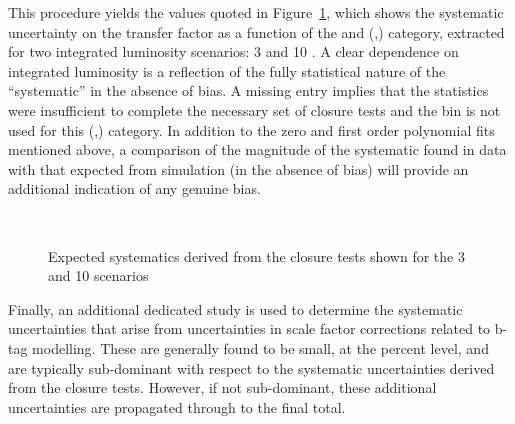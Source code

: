 This procedure yields the values quoted in
Figure~\ref{fig:systematics}, which shows the systematic uncertainty
on the transfer factor as a function of the \scalht and (\nb,\njet)
category, extracted for two integrated luminosity scenarios: 3 \ifb
and 10 \ifb. A clear dependence on integrated luminosity is a
reflection of the fully statistical nature of the ``systematic'' in
the absence of bias. A missing entry implies that the statistics were
insufficient to complete the necessary set of closure tests and the
\scalht bin is not used for this (\njet,\nb) category. In addition to
the zero and first order polynomial fits mentioned above, a comparison
of the magnitude of the systematic found in data with that expected
from simulation (\ie in the absence of bias) will provide an
additional indication of any genuine bias.

\begin{figure}[]
  \centering
   ~~
  \caption{\label{fig:systematics} Expected systematics derived from the closure tests shown for
the 3 \ifb and 10 \ifb scenarios}
\end{figure}

Finally, an additional dedicated study is used to determine the
systematic uncertainties that arise from uncertainties in scale factor
corrections related to b-tag modelling. These are generally found to
be small, at the percent level, and are typically sub-dominant with
respect to the systematic uncertainties derived from the closure
tests. However, if not sub-dominant, these additional uncertainties
are propagated through to the final total.

